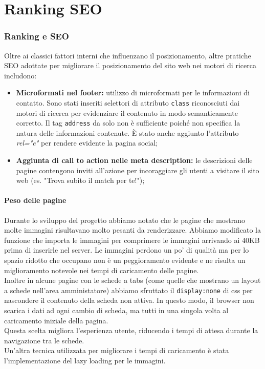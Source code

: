 
\section{Ranking SEO}
\subsubsection{Ranking e SEO}
Oltre ai classici fattori interni che influenzano il posizionamento, altre pratiche SEO adottate per migliorare il posizionamento del sito web nei motori di ricerca includono:
\begin{itemize}
    \item \textbf{Microformati nel footer:} utilizzo di microformati per le informazioni di contatto. Sono stati inseriti selettori di attributo \texttt{class} riconosciuti dai motori di ricerca per evidenziare il contenuto in modo semanticamente corretto. Il tag \texttt{address} da solo non è sufficiente poiché non specifica la natura delle informazioni contenute. È stato anche aggiunto l'attributo \textit{rel="e"} per rendere evidente la pagina social;
    \item \textbf{Aggiunta di call to action nelle meta description:} le descrizioni delle pagine contengono inviti all'azione per incoraggiare gli utenti a visitare il sito web (es. "Trova subito il match per te!");
\end{itemize}
\paragraph{Peso delle pagine}
Durante lo sviluppo del progetto abbiamo notato che le pagine che mostrano molte immagini risultavano molto pesanti da renderizzare. Abbiamo modificato la funzione che importa le immagini per comprimere le immagini arrivando ai 40KB prima di inserirle nel server. Le immagini perdono un po' di qualità ma per lo spazio ridotto che occupano non è un peggioramento evidente e ne risulta un miglioramento notevole nei tempi di caricamento delle pagine.\\
Inoltre in alcune pagine con le schede a tabs (come quelle che mostrano un layout a schede nell'area amministatore) abbiamo sfruttato il \texttt{display:none} di css per nascondere il contenuto della scheda non attiva. In questo modo, il browser non scarica i dati ad ogni cambio di scheda, ma tutti in una singola volta al caricamento iniziale della pagina. \\
Questa scelta migliora l'esperienza utente, riducendo i tempi di attesa durante la navigazione tra le schede.\\
Un'altra tecnica utilizzata per migliorare i tempi di caricamento è stata l'implementazione del lazy loading per le immagini.
